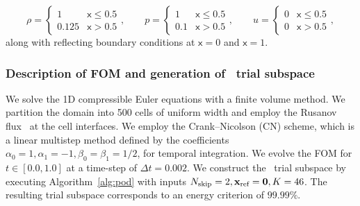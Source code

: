 \begin{equation*}
\rho = 
\begin{cases} 
      1 & \mathsf{x}\leq 0.5 \\
      0.125 & \mathsf{x} > 0.5 
   \end{cases},
\qquad
p = 
\begin{cases} 
      1 & \mathsf{x}\leq 0.5 \\
      0.1 & \mathsf{x} > 0.5 
   \end{cases},
\qquad
u = 
\begin{cases} 
      0 & \mathsf{x}\leq 0.5 \\
      0 & \mathsf{x} > 0.5 
   \end{cases},
\end{equation*}
along with reflecting boundary conditions at $\mathsf{x}=0$ and $\mathsf{x}=1$. 

\subsubsection{Description of FOM and generation of \spatialAcronym\ trial subspace}\label{sec:sod_fom}
We solve the 1D compressible Euler equations with a finite volume method. We partition the domain into 500 cells of uniform width and employ the Rusanov flux~\cite{rusanov} at the cell interfaces. We employ the Crank--Nicolson (CN) scheme, which is a linear multistep method defined by the coefficients $\alpha_0 = 1,\alpha_1 = -1, \beta_0 = \beta_1 = 1/2$, for temporal integration. We evolve the FOM for $t \in [0.0,1.0]$ at a time-step of $\Delta t = 0.002$. We construct the \spatialAcronym\ trial subspace by executing Algorithm~\ref{alg:pod} with inputs $N_{\text{skip}}=2, \mathbf{x}_\text{ref} = \boldsymbol 0, K=46 $. The resulting trial subspace corresponds to an energy criterion of $99.99\%$.


